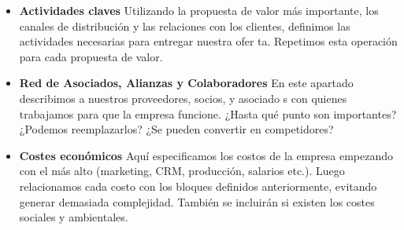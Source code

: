 \begin{itemize}
\item \textbf{Actividades claves} Utilizando la propuesta de valor más importante, los canales de distribución y las relaciones con los clientes, definimos las actividades necesarias para entregar nuestra ofer ta. Repetimos esta operación para cada propuesta de valor.

\item \textbf{Red de Asociados, Alianzas y Colaboradores} En este apartado describimos a nuestros proveedores, socios, y asociado s con quienes trabajamos para que la empresa funcione. ¿Hasta qué punto son importantes? ¿Podemos reemplazarlos? ¿Se pueden convertir en competidores? 

\item \textbf{Costes económicos} Aquí especificamos los costos de la empresa empezando con el más alto (marketing, CRM, producción, salarios etc.). Luego relacionamos cada costo con los bloques definidos anteriormente, evitando generar demasiada complejidad. También se incluirán si existen los costes sociales y ambientales.

\end{itemize}


